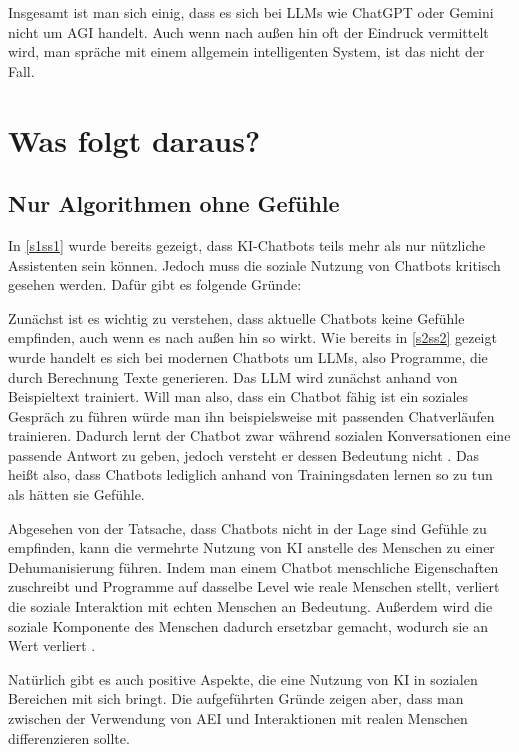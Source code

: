 	\noindent{}Insgesamt ist man sich einig, dass es sich bei LLMs wie ChatGPT oder Gemini nicht um AGI handelt. Auch wenn nach außen
	hin oft der Eindruck vermittelt wird, man spräche mit einem allgemein intelligenten System, ist das nicht der Fall. 
	
	
\clearpage
\section{Was folgt daraus?}\label{s3}
	\subsection{Nur Algorithmen ohne Gefühle}\label{s3ss1}
	In \ref{s1ss1} wurde bereits gezeigt, dass KI-Chatbots teils mehr als nur nützliche Assistenten sein können.
	Jedoch muss die soziale Nutzung von Chatbots kritisch gesehen werden. Dafür gibt es folgende Gründe:

	Zunächst ist es wichtig zu verstehen, dass aktuelle Chatbots keine Gefühle empfinden, auch wenn es nach außen hin so wirkt.
	Wie bereits in \ref{s2ss2} gezeigt wurde handelt es sich bei modernen Chatbots um LLMs, also Programme, die durch Berechnung
	Texte generieren. Das LLM wird zunächst anhand von Beispieltext trainiert. Will man also, dass ein Chatbot fähig ist ein
	soziales Gespräch zu führen würde man ihn beispielsweise mit passenden Chatverläufen trainieren. Dadurch lernt der Chatbot
	zwar während sozialen Konversationen eine passende Antwort zu geben, jedoch versteht er dessen Bedeutung nicht \cite[S. 35-38]{goertzel23}.
	Das heißt also, dass Chatbots lediglich anhand von Trainingsdaten lernen so zu tun als hätten sie Gefühle. 

	Abgesehen von der Tatsache, dass Chatbots nicht in der Lage sind Gefühle zu empfinden, kann die vermehrte Nutzung von KI anstelle
	des Menschen zu einer Dehumanisierung führen. Indem man einem Chatbot menschliche Eigenschaften zuschreibt und Programme auf
	dasselbe Level wie reale Menschen stellt, verliert die soziale Interaktion mit echten Menschen an Bedeutung. Außerdem wird die
	soziale Komponente des Menschen dadurch ersetzbar gemacht, wodurch sie an Wert verliert \cite{chen24}. 	 

	Natürlich gibt es auch positive Aspekte, die eine Nutzung von KI in sozialen Bereichen mit sich bringt. Die aufgeführten Gründe
	zeigen aber, dass man zwischen der Verwendung von AEI und Interaktionen mit realen Menschen differenzieren sollte.
	  
	\clearpage
